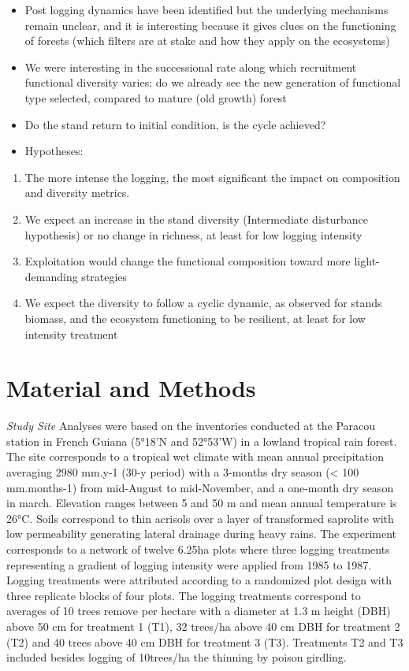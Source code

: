 \documentclass[fleqn,10pt]{ArtEcoFoG} %
\begin{document}
\begin{itemize}
\item
  Post logging dynamics have been identified but the underlying
  mechanisms remain unclear, and it is interesting because it gives
  clues on the functioning of forests (which filters are at stake and
  how they apply on the ecosystems)
\item
  We were interesting in the successional rate along which recruitment
  functional diversity varies: do we already see the new generation of
  functional type selected, compared to mature (old growth) forest
\item
  Do the stand return to initial condition, is the cycle achieved?
\item
  Hypotheses:
\end{itemize}

\begin{enumerate}
\def\labelenumi{\arabic{enumi})}
\item
  The more intense the logging, the most significant the impact on
  composition and diversity metrics.
\item
  We expect an increase in the stand diversity (Intermediate disturbance
  hypothesis) or no change in richness, at least for low logging
  intensity
\item
  Exploitation would change the functional composition toward more
  light-demanding strategies
\item
  We expect the diversity to follow a cyclic dynamic, as observed for
  stands biomass, and the ecosystem functioning to be resilient, at
  least for low intensity treatment
\end{enumerate}

\section{Material and Methods}\label{material-and-methods}

\emph{Study Site} Analyses were based on the inventories conducted at
the Paracou station in French Guiana (5°18'N and 52°53'W) in a lowland
tropical rain forest. The site corresponds to a tropical wet climate
with mean annual precipitation averaging 2980 mm.y-1 (30-y period) with
a 3-months dry season (\textless{} 100 mm.months-1) from mid-August to
mid-November, and a one-month dry season in march. Elevation ranges
between 5 and 50 m and mean annual temperature is 26°C. Soils correspond
to thin acrisols over a layer of transformed saprolite with low
permeability generating lateral drainage during heavy rains. The
experiment corresponds to a network of twelve 6.25ha plots where three
logging treatments representing a gradient of logging intensity were
applied from 1985 to 1987. Logging treatments were attributed according
to a randomized plot design with three replicate blocks of four plots.
The logging treatments correspond to averages of 10 trees remove per
hectare with a diameter at 1.3 m height (DBH) above 50 cm for treatment
1 (T1), 32 trees/ha above 40 cm DBH for treatment 2 (T2) and 40 trees
above 40 cm DBH for treatment 3 (T3). Treatments T2 and T3 included
besides logging of 10trees/ha the thinning by poison girdling.
\end{document}
